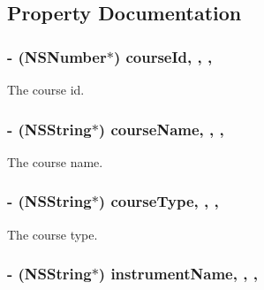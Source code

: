 \subsection{Property Documentation}
\hypertarget{interface_course_ad03513473cc83651e36749f9e5c5be69}{
\subsubsection[{course\+Id}]{\setlength{\rightskip}{0pt plus 5cm}-\/ (N\+S\+Number$\ast$) course\+Id\hspace{0.3cm}{\ttfamily [read]}, {\ttfamily [write]}, {\ttfamily [nonatomic]}, {\ttfamily [assign]}}}\label{interface_course_ad03513473cc83651e36749f9e5c5be69}
The course id. \hypertarget{interface_course_ace0d7cddc92e6c0d10b1cac95302e1de}{
\subsubsection[{course\+Name}]{\setlength{\rightskip}{0pt plus 5cm}-\/ (N\+S\+String$\ast$) course\+Name\hspace{0.3cm}{\ttfamily [read]}, {\ttfamily [write]}, {\ttfamily [nonatomic]}, {\ttfamily [assign]}}}\label{interface_course_ace0d7cddc92e6c0d10b1cac95302e1de}
The course name. \hypertarget{interface_course_a16df4d28af9a7f6e91a5aa4ce583453d}{
\subsubsection[{course\+Type}]{\setlength{\rightskip}{0pt plus 5cm}-\/ (N\+S\+String$\ast$) course\+Type\hspace{0.3cm}{\ttfamily [read]}, {\ttfamily [write]}, {\ttfamily [nonatomic]}, {\ttfamily [assign]}}}\label{interface_course_a16df4d28af9a7f6e91a5aa4ce583453d}
The course type. \hypertarget{interface_course_a907b62f431b16309eb1dddb6786f2456}{
\subsubsection[{instrument\+Name}]{\setlength{\rightskip}{0pt plus 5cm}-\/ (N\+S\+String$\ast$) instrument\+Name\hspace{0.3cm}{\ttfamily [read]}, {\ttfamily [write]}, {\ttfamily [nonatomic]}, {\ttfamily [assign]}}}\label{interface_course_a907b62f431b16309eb1dddb6786f2456}
